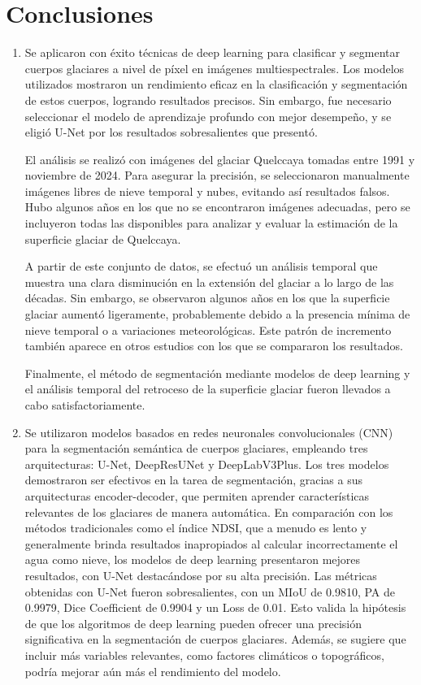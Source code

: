 \chapter*{Conclusiones}
\doublespacing
\begin{enumerate}
	\item Se aplicaron con éxito técnicas de deep learning para clasificar y segmentar cuerpos glaciares a nivel de píxel en imágenes multiespectrales. Los modelos utilizados mostraron un rendimiento eficaz en la clasificación y segmentación de estos cuerpos, logrando resultados precisos. Sin embargo, fue necesario seleccionar el modelo de aprendizaje profundo con mejor desempeño, y se eligió U-Net por los resultados sobresalientes que presentó.
	
	El análisis se realizó con imágenes del glaciar Quelccaya tomadas entre 1991 y noviembre de 2024. Para asegurar la precisión, se seleccionaron manualmente imágenes libres de nieve temporal y nubes, evitando así resultados falsos. Hubo algunos años en los que no se encontraron imágenes adecuadas, pero se incluyeron todas las disponibles para analizar y evaluar la estimación de la superficie glaciar de Quelccaya.
	
	A partir de este conjunto de datos, se efectuó un análisis temporal que muestra una clara disminución en la extensión del glaciar a lo largo de las décadas. Sin embargo, se observaron algunos años en los que la superficie glaciar aumentó ligeramente, probablemente debido a la presencia mínima de nieve temporal o a variaciones meteorológicas. Este patrón de incremento también aparece en otros estudios con los que se compararon los resultados.
	
	Finalmente, el método de segmentación mediante modelos de deep learning y el análisis temporal del retroceso de la superficie glaciar fueron llevados a cabo satisfactoriamente.
	
	\item Se utilizaron modelos basados en redes neuronales convolucionales (CNN) para la segmentación semántica de cuerpos glaciares, empleando tres arquitecturas: U-Net, DeepResUNet y DeepLabV3Plus. Los tres modelos demostraron ser efectivos en la tarea de segmentación, gracias a sus arquitecturas encoder-decoder, que permiten aprender características relevantes de los glaciares de manera automática. En comparación con los métodos tradicionales como el índice NDSI, que a menudo es lento y generalmente brinda resultados inapropiados al calcular incorrectamente el agua como nieve, los modelos de deep learning presentaron mejores resultados, con U-Net destacándose por su alta precisión. Las métricas obtenidas con U-Net fueron sobresalientes, con un MIoU de 0.9810, PA de 0.9979, Dice Coefficient de 0.9904 y un Loss de 0.01. Esto valida la hipótesis de que los algoritmos de deep learning pueden ofrecer una precisión significativa en la segmentación de cuerpos glaciares. Además, se sugiere que incluir más variables relevantes, como factores climáticos o topográficos, podría mejorar aún más el rendimiento del modelo.
	

\end{enumerate}
